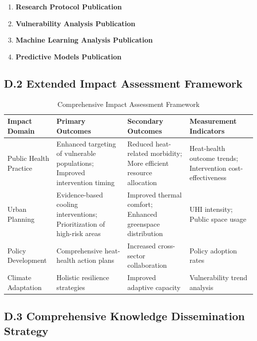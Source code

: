 \documentclass[12pt,a4paper,landscape]{article}
\begin{document}
\begin{enumerate}[leftmargin=*, itemsep=0.5em]
    \item \textbf{Research Protocol Publication}
    \item \textbf{Vulnerability Analysis Publication}
    \item \textbf{Machine Learning Analysis Publication}
    \item \textbf{Predictive Models Publication}
\end{enumerate}

\subsection*{D.2 Extended Impact Assessment Framework}
\begin{table}[H]
    \centering
    \caption{Comprehensive Impact Assessment Framework}
    \label{tab:extended_impact}
    \begin{tabular}{L{2.5cm}L{5cm}L{5cm}L{3cm}}
        \toprule
        \textbf{Impact Domain} & \textbf{Primary Outcomes} & \textbf{Secondary Outcomes} & \textbf{Measurement Indicators} \\
        \midrule
        Public Health Practice & 
        Enhanced targeting of vulnerable populations; Improved intervention timing & 
        Reduced heat-related morbidity; More efficient resource allocation & 
        Heat-health outcome trends; Intervention cost-effectiveness \\
        \addlinespace
        Urban Planning & 
        Evidence-based cooling interventions; Prioritization of high-risk areas & 
        Improved thermal comfort; Enhanced greenspace distribution & 
        UHI intensity; Public space usage \\
        \addlinespace
        Policy Development & 
        Comprehensive heat-health action plans & 
        Increased cross-sector collaboration & 
        Policy adoption rates \\
        \addlinespace
        Climate Adaptation & 
        Holistic resilience strategies & 
        Improved adaptive capacity & 
        Vulnerability trend analysis \\
        \bottomrule
    \end{tabular}
\end{table}

\subsection*{D.3 Comprehensive Knowledge Dissemination Strategy}
\end{document}
